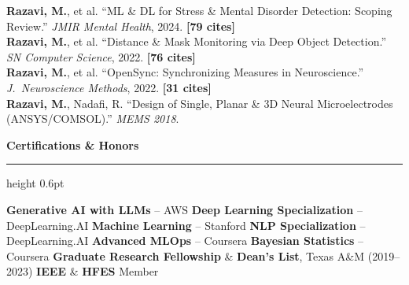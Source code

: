 \documentclass[10.5pt,letterpaper]{article}
\newcommand{\sdot}{\textperiodcentered}
\newcommand{\cvsection}[1]{%
  \vspace{0.45em}%
  {\color{headerblue}\large\bfseries #1}%
  \vspace{0.04em}%
  {\color{goldaccent}\hrule height 0.6pt}%
  \vspace{0.12em}%
}
\begin{document}
{\color{darktext}
\textbf{Razavi, M.}, et al. ``ML \& DL for Stress \& Mental Disorder Detection: Scoping Review.'' \textit{JMIR Mental Health}, 2024. \textbf{[79 cites]}\\[0.04em]
\textbf{Razavi, M.}, et al. ``Distance \& Mask Monitoring via Deep Object Detection.'' \textit{SN Computer Science}, 2022. \textbf{[76 cites]}\\[0.04em]
\textbf{Razavi, M.}, et al. ``OpenSync: Synchronizing Measures in Neuroscience.'' \textit{J.\ Neuroscience Methods}, 2022. \textbf{[31 cites]}\\[0.04em]
\textbf{Razavi, M.}, Nadafi, R. ``Design of Single, Planar \& 3D Neural Microelectrodes (ANSYS/COMSOL).'' \textit{MEMS 2018}.
}

\cvsection{Certifications \& Honors}

{\color{darktext}
\textbf{Generative AI with LLMs} {\color{lightgray}-- AWS}\enskip\sdot\enskip
\textbf{Deep Learning Specialization} {\color{lightgray}-- DeepLearning.AI}\enskip\sdot\enskip
\textbf{Machine Learning} {\color{lightgray}-- \mbox{Stanford}}\enskip\sdot\enskip
\textbf{NLP Specialization} {\color{lightgray}-- DeepLearning.AI}\enskip\sdot\enskip
\textbf{Advanced MLOps} {\color{lightgray}-- Coursera}\enskip\sdot\enskip
\textbf{Bayesian Statistics} {\color{lightgray}-- Coursera}\enskip\sdot\enskip
\textbf{Graduate \mbox{Research} Fellowship} \& \textbf{Dean's List}, Texas A\&M (2019--2023)\enskip\sdot\enskip
\textbf{IEEE} \& \textbf{HFES} Member
}
\end{document}
